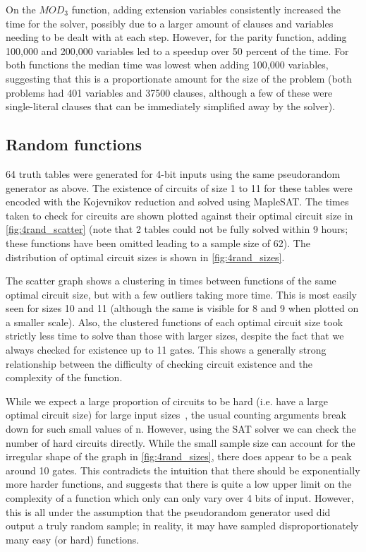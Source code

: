 \documentclass{article}
\begin{document}
On the \(MOD_3\) function, adding extension variables consistently increased the time for the solver, possibly due to a larger amount of clauses and variables needing to be dealt with at each step. However, for the parity function, adding 100,000 and 200,000 variables led to a speedup over 50 percent of the time. For both functions the median time was lowest when adding 100,000 variables, suggesting that this is a proportionate amount for the size of the problem (both problems had 401 variables and 37500 clauses, although a few of these were single-literal clauses that can be immediately simplified away by the solver).

\subsection{Random functions}\label{randomresults}

64 truth tables were generated for 4-bit inputs using the same pseudorandom generator as above. The existence of circuits of size 1 to 11 for these tables were encoded with the Kojevnikov reduction and solved using MapleSAT. The times taken to check for circuits are shown plotted against their optimal circuit size in \ref{fig:4rand_scatter} (note that 2 tables could not be fully solved within 9 hours; these functions have been omitted leading to a sample size of 62). The distribution of optimal circuit sizes is shown in \ref{fig:4rand_sizes}.

The scatter graph shows a clustering in times between functions of the same optimal circuit size, but with a few outliers taking more time. This is most easily seen for sizes 10 and 11 (although the same is visible for 8 and 9 when plotted on a smaller scale). Also, the clustered functions of each optimal circuit size took strictly less time to solve than those with larger sizes, despite the fact that we always checked for existence up to 11 gates. This shows a generally strong relationship between the difficulty of checking circuit existence and the complexity of the function.

While we expect a large proportion of circuits to be hard (i.e. have a large optimal circuit size) for large input sizes~\cite{arora}, the usual counting arguments break down for such small values of n. However, using the SAT solver we can check the number of hard circuits directly. While the small sample size can account for the irregular shape of the graph in \ref{fig:4rand_sizes}, there does appear to be a peak around 10 gates. This contradicts the intuition that there should be exponentially more harder functions, and suggests that there is quite a low upper limit on the complexity of a function which only can only vary over 4 bits of input. However, this is all under the assumption that the pseudorandom generator used did output a truly random sample; in reality, it may have sampled disproportionately many easy (or hard) functions.
\end{document}

